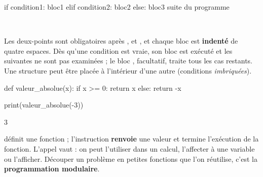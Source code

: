 
\noindent
\begin{minipage}[c]{0.44\linewidth}
\begin{python}
if condition1:
    bloc1
elif condition2:
    bloc2
else:
    bloc3
suite du programme
\end{python}
\end{minipage}\hfill
\begin{minipage}[c]{0.52\linewidth}
\centering
{}\\[0.5mm]
\end{minipage}

\begin{propriete}
Les deux-points \code{:} sont obligatoires après ,  et , et chaque bloc est \textbf{indenté} de quatre
espaces. Dès qu'une condition est vraie, son bloc est exécuté et les suivantes ne sont pas examinées ; le bloc , facultatif,
traite tous les cas restants. Une structure peut être placée à l'intérieur d'une autre (conditions \emph{imbriquées}).
\end{propriete}


\noindent
\begin{minipage}[c]{0.48\linewidth}
\begin{python}
def valeur_absolue(x):
    if x >= 0:
        return x
    else:
        return -x

print(valeur_absolue(-3))
\end{python}
\begin{console}
3
\end{console}
\end{minipage}\hfill
\begin{minipage}[c]{0.48\linewidth}
\begin{definition}[Fonction]
\raggedright
{} définit une fonction ; l'instruction  \textbf{renvoie} une valeur et termine l'exécution de la
fonction. L'appel  vaut  : on peut l'utiliser dans un calcul, l'affecter à une variable ou l'afficher.
Découper un problème en petites fonctions que l'on réutilise, c'est la \textbf{programmation modulaire}.
\end{definition}
\end{minipage}

